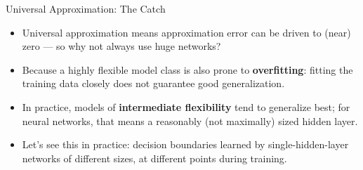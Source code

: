\begin{vbframe}{Universal Approximation: The Catch}
\begin{itemize}
\item Universal approximation means approximation error can be driven to (near) zero --- so why not always use huge networks?
\vspace{4mm}
\item Because a highly flexible model class is also prone to \textbf{overfitting}: fitting the training data closely does not guarantee good generalization.
\vspace{4mm}
\item In practice, models of \textbf{intermediate flexibility} tend to generalize best; for neural networks, that means a reasonably (not maximally) sized hidden layer.
\vspace{4mm}
\item Let's see this in practice: decision boundaries learned by single-hidden-layer networks of different sizes, at different points during training.
\end{itemize}
\end{vbframe}
